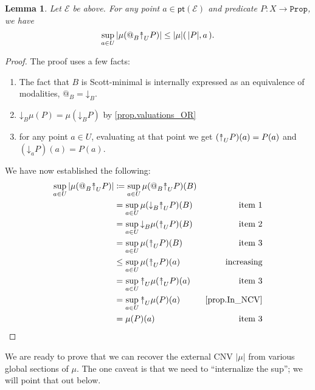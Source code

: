 \documentclass[11pt, oneside, article]{memoir}
\makeatletter
\theoremstyle{plain}
\newtheorem{lemma}[theorem]{Lemma}
\theoremstyle{definition}
\theoremstyle{remark}
\newcommand{\const}[1]{\mathtt{#1}}
\newcommand{\cat}[1]{\mathcal{#1}}
\newcommand{\Fun}[1]{\mathsf{#1}}
\newcommand{\Prop}{\const{Prop}}
\newcommand{\pt}{\Fun{pt}}
\newcommand{\AtSymbol}{{@}}
\newcommand{\SeeSymbol}{{\down}}  %
\newcommand{\InSymbol}{{\upclose}}%
\newcommand{\At}[2][]{\AtSymbol^{#1}_{#2}}
\newcommand{\See}[2][]{\SeeSymbol^{#1}_{#2}}
\newcommand{\In}[2][]{\InSymbol^{#1}_{#2}}
\newcommand{\upclose}{{\rotatebox[origin=c]{90}{$\twoheadrightarrow$}}}
\newcommand{\down}{\mathord{\downarrow}}
\makeatother
\begin{document}
\begin{lemma}\label{lemma.inequality_rand9865}
Let $\cat{E}$ be above. For any point $a\in\pt(\cat{E})$ and predicate $P:X\to\Prop$, we have
\[
\sup_{a\in U}|\mu(\At{B}\In{U}P)|\leq |\mu|(\,|P|,a\,).
\]
\end{lemma}
\begin{proof}
The proof uses a few facts:
\begin{enumerate}
	\item The fact that $B$ is Scott-minimal is internally expressed as an equivalence of modalities, $\At{B}=\See{B}$.
	\item $\See{B}\mu(P)=\mu(\See{B}P)$ by \cref{prop.valuations_OR}
	\item for any point $a\in U$, evaluating at that point we get $(\In{U}P)(a)=P(a)$ and $(\See{a}P)(a)=P(a)$.
\end{enumerate}
We have now established the following:
\begin{align}
\nonumber
	\sup_{a\in U}|\mu(\At{B}\In{U}P)|
	&\coloneqq\sup_{a\in U}\mu(\At{B}\In{U}P)(B)\\
	&=\sup_{a\in U}\mu(\See{B}\In{U}P)(B)&\text{item 1}\\\nonumber
	&=\sup_{a\in U}\See{B}\mu(\In{U}P)(B)&\text{item 2}\\\nonumber
	&=\sup_{a\in U}\mu(\In{U}P)(B)&\text{item 3}\\\nonumber
	&\leq\sup_{a\in U}\mu(\In{U}P)(a)&\text{increasing}\\\nonumber
	&=\sup_{a\in U}\In{U}\mu(\In{U}P)(a)&\text{item 3}\\\nonumber
	&=\sup_{a\in U}\In{U}\mu(P)(a)&\text{\cref{prop.In_NCV}}\\\nonumber
	&=\mu(P)(a)&\text{item 3}
\end{align}
\end{proof}

We are ready to prove that we can recover the external CNV $|\mu|$ from various global sections of $\mu$. The one caveat is that we need to ``internalize the sup''; we will point that out below.
\end{document}
